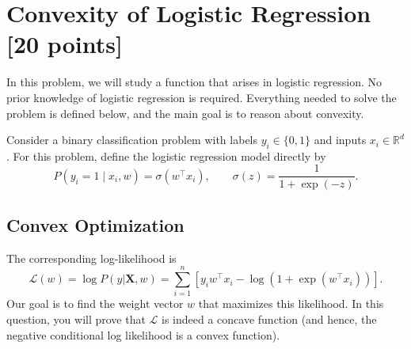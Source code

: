 \section{Convexity of Logistic Regression [20 points]}
In this problem, we will study a function that arises in logistic regression. 
No prior knowledge of logistic regression is required. Everything needed to solve the problem is defined below, and the main goal is to reason about convexity.

Consider a binary classification problem with labels $y_i \in \{0,1\}$ and inputs $x_i \in \mathbb{R}^d$. For this problem, define the logistic regression model directly by
\begin{equation*}
    P(y_i=1 \mid x_i,w)=\sigma(w^\top x_i), \qquad \sigma(z)=\frac{1}{1+\exp(-z)}.
\end{equation*} 

\subsection{Convex Optimization}
The corresponding log-likelihood is 
\begin{equation*}
    \mathcal{L}(w) = \log P(y|\mathbf{X}, w) = \sum_{i=1}^n[y_i w^\top x_i - \log(1+ \exp(w^\top x_i))].
\end{equation*}
Our goal is to find the weight vector $w$ that maximizes this likelihood. In this question, you will prove that $\mathcal{L}$ is indeed a concave function (and hence, the negative conditional log likelihood is a convex function). 

